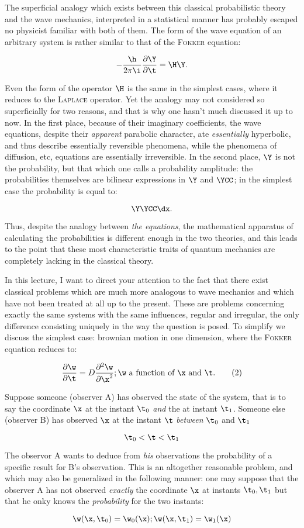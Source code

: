 \documentclass{article}
\newcommand{\nequ}[2]{
\begin{equation*}
#1
\tag{#2}
\end{equation*}
}
\newcommand{\uequ}[1]{
\begin{equation*}
#1
\end{equation*}
}
\newcommand{\var}[1]{#1}
\newcommand{\pddt}[1]{\pdXdY{#1}{\t}}
\newcommand{\pdXdY}[2]{
\frac{\partial {#1}}{\partial {#2}}
}
\newcommand{\pddXdYY}[2]{
\frac{\partial^2 {#1}}{\partial {#2}^2}
}
\renewcommand{\it}[1]{\textit{#1}}
\renewcommand{\sc}[1]{\textsc{#1}}
\begin{document}
The superficial analogy which exists between this classical probabilistic theory and the wave mechanics, interpreted in a statistical manner has probably escaped no physicist familiar with both of them. The form of the wave equation of an arbitrary system is rather similar to that of the \sc{Fokker} equation:
\uequ{
-\frac{\h}{2\pi\i}\pddt{\Y} = \H\Y.
}

Even the form of the operator $\H$ is the same in the simplest cases, where it reduces to the \sc{Laplace} operator. Yet the analogy may not considered so superficially for two reasons, and that is why one hasn't much discussed it up to now. In the first place, because of their imaginary coefficients, the wave equations, despite their \it{apparent} parabolic character, ate \it{essentially} hyperbolic, and thus describe essentially reversible phenomena, while the phenomena of diffusion, etc, equations are essentially irreversible. In the second place, $\Y$ is not the probability, but that which one calls a probability amplitude: the probabilities themselves are bilinear expressions in $\Y$ and $\YCC$; in the simplest case the probability is equal to:
\uequ{
\Y\YCC\dx.
}

Thus, despite the analogy between \it{the equations}, the mathematical apparatus of calculating the probabilities is different enough in the two theories, and this leads to the point that these most characteristic traits of quantum mechanics are completely lacking in the classical theory.

In this lecture, I want to direct your attention to the fact that there exist classical problems which are much more analogous to wave mechanics and which have not been treated at all up to the present. These are problems concerning exactly the same systems with the same influences, regular and irregular, the only difference consisting uniquely in the way the question is posed. To simplify we discuss the simplest case: brownian motion in one dimension, where the \sc{Fokker} equation reduces to:
\nequ{
\pddt{\w} = \var{D}\pddXdYY{\w}{\x}; \w \text{ a function of } \x \text{ and } \t.
}{2}

Suppose someone (observer A) has observed the state of the system, that is to say the coordinate $\x$ at the instant $\t_0$ \it{and} the at instant $\t_1$. Someone else (observer B) has observed $\x$ at the instant $\t$ \it{between} $\t_0$ and $\t_1$
\uequ{
\t_0 < \t < \t_1
}

The observor A wants to deduce from \it{his} observations the probability of a specific result for B's observation. This is an altogether reasonable problem, and which may also be generalized in the following manner: one may suppose that the observer A has not observed \it{exactly} the coordinate $\x$ at instants $\t_0, \t_1$ but that he onky knows the \it{probability} for the two instants:
\uequ{
\w(\x, \t_0) = \w_0(\x); \w(\x, \t_1) = \w_1(\x)
}
\end{document}
